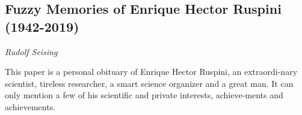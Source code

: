 \documentclass[../booklet.tex]{subfiles}
\begin{document}
\subsection[Fuzzy Memories of Enrique Hector Ruspini (1942-2019). {\it Rudolf Seising}]{Fuzzy Memories of Enrique Hector Ruspini (1942-2019)}

\begin{center}
  {\it Rudolf Seising}
\end{center}

\vskip 0.8cm

This paper is a personal obituary of Enrique Hector Ruspini, an extraordi-nary scientist, tireless researcher, a smart science organizer and a great man. It can only mention a few of his scientific and private interests, achieve-ments and achievements.
\end{document}
